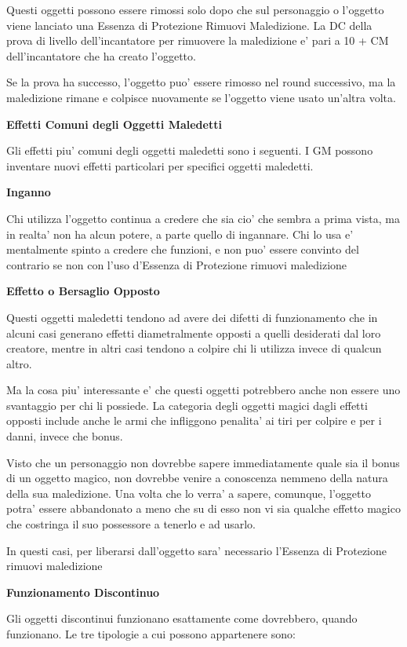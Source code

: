 \documentclass[a4paper,11pt,twoside,openany]{book}
\begin{document}
{		Questi oggetti possono essere rimossi solo dopo che sul personaggio o l'oggetto viene lanciato una Essenza di Protezione Rimuovi Maledizione. La DC della prova di livello dell'incantatore per rimuovere la maledizione e' pari a 10 + CM dell'incantatore che ha creato l'oggetto.
		
		Se la prova ha successo, l'oggetto puo' essere rimosso nel round successivo, ma la maledizione rimane e colpisce nuovamente se l'oggetto viene usato un'altra volta.
		
		\textbf{Effetti Comuni degli Oggetti Maledetti}
		
		Gli effetti piu' comuni degli oggetti maledetti sono i seguenti. I GM possono inventare nuovi effetti particolari per specifici oggetti maledetti.
		
		\textbf{Inganno}
		
		Chi utilizza l'oggetto continua a credere che sia cio' che sembra a prima vista, ma in realta' non ha alcun potere, a parte quello di ingannare. Chi lo usa e' mentalmente spinto a credere che funzioni, e non puo' essere convinto del contrario se non con l'uso d'Essenza di Protezione rimuovi maledizione
		
		\textbf{Effetto o Bersaglio Opposto}
		
		Questi oggetti maledetti tendono ad avere dei difetti di funzionamento che in alcuni casi generano effetti diametralmente opposti a quelli desiderati dal loro creatore, mentre in altri casi tendono a colpire chi li utilizza invece di qualcun altro.
		
		Ma la cosa piu' interessante e' che questi oggetti potrebbero anche non essere uno svantaggio per chi li possiede. La categoria degli oggetti magici dagli effetti opposti include anche le armi che infliggono penalita' ai tiri per colpire e per i danni, invece che bonus.
		
		Visto che un personaggio non dovrebbe sapere immediatamente quale sia il bonus di un oggetto magico, non dovrebbe venire a conoscenza nemmeno della natura della sua maledizione. Una volta che lo verra' a sapere, comunque, l'oggetto potra' essere abbandonato a meno che su di esso non vi sia qualche effetto magico che costringa il suo possessore a tenerlo e ad usarlo.
		
		In questi casi, per liberarsi dall'oggetto sara' necessario l'Essenza di Protezione rimuovi maledizione
		
		\textbf{Funzionamento Discontinuo}
		
		Gli oggetti discontinui funzionano esattamente come dovrebbero, quando funzionano. Le tre tipologie a cui possono appartenere sono:
		
}
\end{document}
